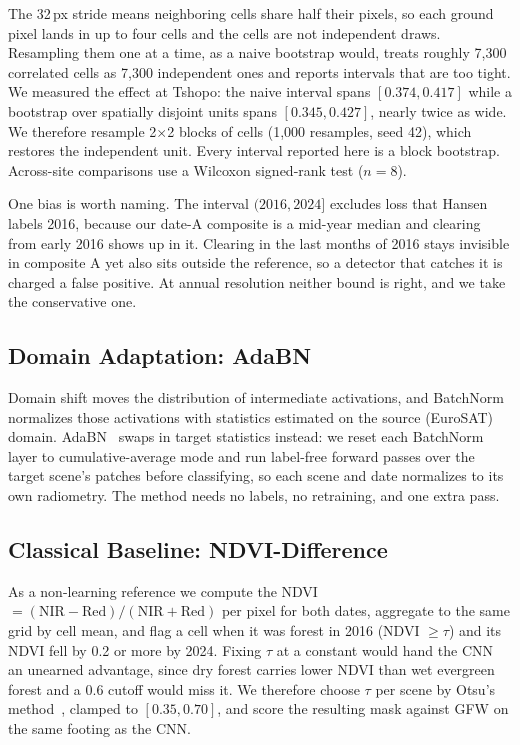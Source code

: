 \documentclass[journal]{IEEEtran}
\begin{document}
The 32\,px stride means neighboring cells share half their pixels, so each ground
pixel lands in up to four cells and the cells are not independent draws. Resampling
them one at a time, as a naive bootstrap would, treats roughly 7{,}300 correlated
cells as 7{,}300 independent ones and reports intervals that are too tight. We
measured the effect at Tshopo: the naive interval spans $[0.374,0.417]$ while a
bootstrap over spatially disjoint units spans $[0.345,0.427]$, nearly twice as
wide. We therefore resample 2$\times$2 blocks of cells (1{,}000 resamples, seed
42), which restores the independent unit. Every interval reported here is a block
bootstrap. Across-site comparisons use a Wilcoxon signed-rank test ($n{=}8$).

One bias is worth naming. The interval $(2016,2024]$ excludes loss that Hansen
labels 2016, because our date-A composite is a mid-year median and clearing from
early 2016 shows up in it. Clearing in the last months of 2016 stays invisible in
composite A yet also sits outside the reference, so a detector that catches it is
charged a false positive. At annual resolution neither bound is right, and we take
the conservative one.

\subsection{Domain Adaptation: AdaBN}
Domain shift moves the distribution of intermediate activations, and
BatchNorm~\cite{ioffe2015} normalizes those activations with statistics estimated
on the source (EuroSAT) domain. AdaBN~\cite{li2016} swaps in target statistics
instead: we reset each BatchNorm layer to cumulative-average mode and run
label-free forward passes over the target scene's patches before classifying, so
each scene and date normalizes to its own radiometry. The method needs no labels,
no retraining, and one extra pass.

\subsection{Classical Baseline: NDVI-Difference}
As a non-learning reference we compute the NDVI~\cite{tucker1979}
$=(\mathrm{NIR}-\mathrm{Red})/(\mathrm{NIR}+\mathrm{Red})$ per pixel for both
dates, aggregate to the same grid by cell mean, and flag a cell when it was forest
in 2016 (NDVI $\geq\tau$) and its NDVI fell by 0.2 or more by 2024. Fixing $\tau$
at a constant would hand the CNN an unearned advantage, since dry forest carries
lower NDVI than wet evergreen forest and a 0.6 cutoff would miss it. We therefore
choose $\tau$ per scene by Otsu's method~\cite{otsu1979}, clamped to $[0.35,0.70]$,
and score the resulting mask against GFW on the same footing as the CNN.
\end{document}

